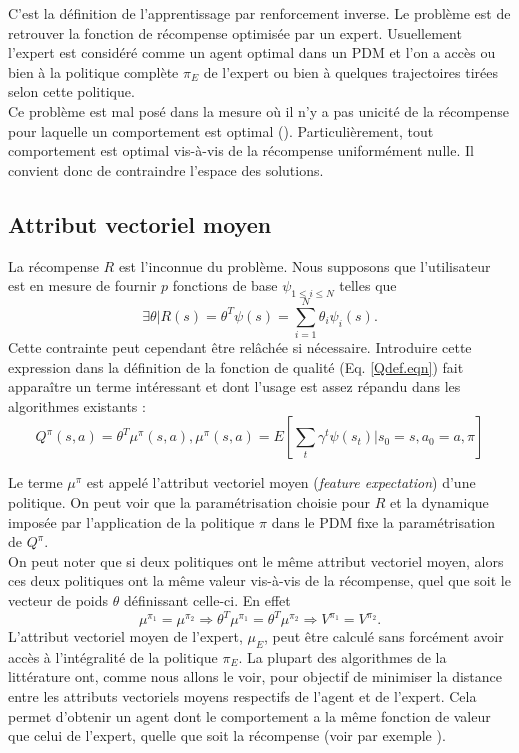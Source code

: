 \documentclass[publibook-draft]{CAp2012}
\begin{document}
C'est la définition de l'apprentissage par renforcement inverse. Le problème est de retrouver la fonction de récompense optimisée par un expert. Usuellement l'expert est considéré comme un agent optimal dans un PDM et l'on a accès ou bien à la politique complète $\pi_E$ de l'expert ou bien à quelques trajectoires tirées selon cette politique.\\

Ce problème est mal posé dans la mesure où il n'y a pas unicité de la récompense pour laquelle un comportement est optimal (\cite{ng1999policy}). Particulièrement, tout comportement est optimal vis-à-vis de la récompense uniformément nulle. Il convient donc de contraindre l'espace des solutions.
\subsection{Attribut vectoriel moyen}
\label{ConsiderationsTechniques.sec}
La récompense $R$ est l'inconnue du problème. Nous supposons que l'utilisateur est en mesure de fournir $p$ fonctions de base $\psi_{1\leq i \leq N}$ telles que
\begin{equation}
\label{hatRdef.eqn}
\exists \theta | R(s) = \theta^T\psi(s) = \sum_{i=1}^N\theta_i\psi_i(s).
\end{equation}
Cette contrainte peut cependant être relâchée si nécessaire. Introduire cette expression dans la définition de la fonction de qualité (Eq. \eqref{Qdef.eqn}) fait apparaître un terme intéressant et dont l'usage est assez répandu dans les algorithmes existants :
\begin{equation}
Q^\pi(s,a) = \theta^T\mu^\pi(s,a),\mu^\pi(s,a) = E[\sum_t\gamma^t\psi(s_t)|s_0=s,a_0=a,\pi]
\label{Qmu.eqn}
\end{equation}

Le terme $\mu^\pi$ est appelé l'attribut vectoriel moyen ({\it feature expectation}) d'une politique. On peut voir que la paramétrisation choisie pour $R$ et la dynamique imposée par l'application de la politique $\pi$ dans le PDM fixe la paramétrisation de $Q^\pi$.\\

On peut noter que si deux politiques ont le même attribut vectoriel moyen, alors ces deux politiques ont la même valeur vis-à-vis de la récompense, quel que soit le vecteur de poids $\theta$ définissant celle-ci. En effet
\begin{equation}
\mu^{\pi_1} = \mu^{\pi_2} \Rightarrow \theta^T\mu^{\pi_1} = \theta^T\mu^{\pi_2} \Rightarrow V^{\pi_1} = V^{\pi_2}.
\label{memevaleur.eqn}
\end{equation}
L'attribut vectoriel moyen de l'expert, $\mu_E$, peut être calculé sans forcément avoir accès à l'intégralité de la politique $\pi_E$. La plupart des algorithmes de la littérature ont, comme nous allons le voir, pour objectif de minimiser la distance entre les attributs vectoriels moyens respectifs de l'agent et de l'expert. Cela permet d'obtenir un agent dont le comportement a la même fonction de valeur que celui de l'expert, quelle que soit la récompense (voir par exemple \cite{neu2009training}).
\end{document}
